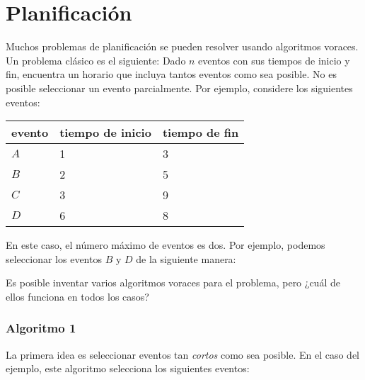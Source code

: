 \section{Planificación}

Muchos problemas de planificación se pueden resolver
usando algoritmos voraces.
Un problema clásico es el siguiente:
Dado $n$ eventos con sus tiempos de inicio y fin,
encuentra un horario
que incluya tantos eventos como sea posible.
No es posible seleccionar un evento parcialmente.
Por ejemplo, considere los siguientes eventos:
\begin{center}
\begin{tabular}{lll}
evento & tiempo de inicio & tiempo de fin \\
\hline
$A$ & 1 & 3 \\
$B$ & 2 & 5 \\
$C$ & 3 & 9 \\
$D$ & 6 & 8 \\
\end{tabular}
\end{center}
En este caso, el número máximo de eventos es dos.
Por ejemplo, podemos seleccionar los eventos $B$ y $D$
de la siguiente manera:
\begin{center}
\end{center}

Es posible inventar varios algoritmos voraces
para el problema, pero ¿cuál de ellos funciona en todos los casos?

\subsubsection*{Algoritmo 1}
La primera idea es seleccionar eventos tan \emph{cortos} como sea posible.
En el caso del ejemplo, este algoritmo
selecciona los siguientes eventos:
\begin{center}
\end{center}


